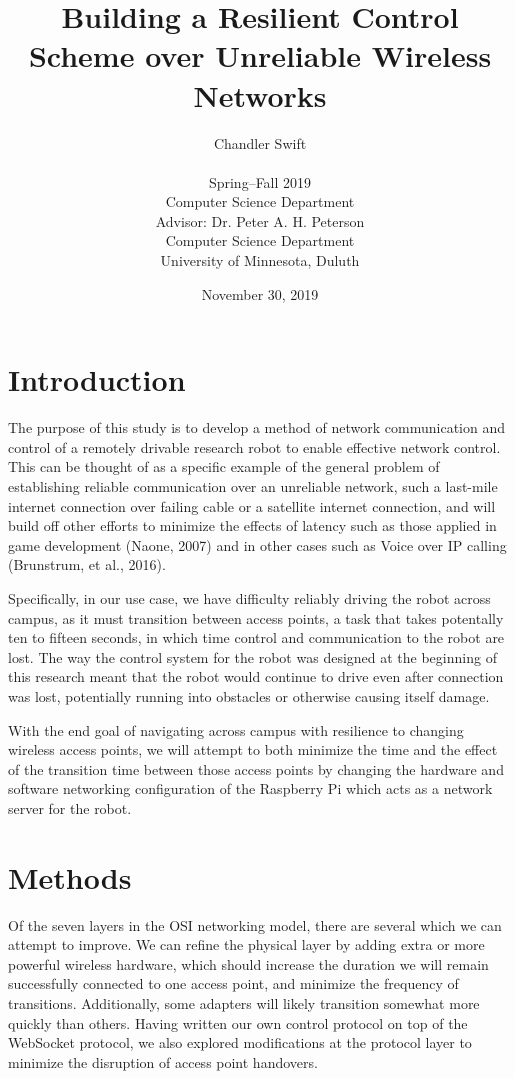 \documentclass[letterpaper, 11pt]{article}
\title{Building a Resilient Control Scheme over Unreliable Wireless Networks}
\author{Chandler Swift \\ \\
  Spring--Fall 2019 \\
  Computer Science Department \\
  Advisor: Dr. Peter A. H. Peterson \\
  Computer Science Department \\
  University of Minnesota, Duluth
}
\date{November 30, 2019}
\begin{document}
\maketitle
\section{Introduction}
The purpose of this study is to develop a method of network communication and
control of a remotely drivable research robot to enable effective network
control. This can be thought of as a specific example of the general problem
of establishing reliable communication over an unreliable network, such a
last-mile internet connection over failing cable or a satellite internet
connection, and will build off other efforts to minimize the effects of
latency such as those applied in game development (Naone, 2007) and in other
cases such as Voice over IP calling (Brunstrum,  et al., 2016).

Specifically, in our use case, we have difficulty reliably driving the robot
across campus, as it must transition between access points, a task that takes
potentally ten to fifteen seconds, in which time control and communication to
the robot are lost. The way the control system for the robot was designed at
the beginning of this research meant that the robot would continue to drive
even after connection was lost, potentially running into obstacles or
otherwise causing itself damage.

With the end goal of navigating across campus with resilience to changing
wireless access points, we will attempt to both minimize the time and the
effect of the transition time between those access points by changing the
hardware and software networking configuration of the Raspberry Pi which
acts as a network server for the robot.

\section{Methods}
Of the seven layers in the OSI networking model, there are several which we
can attempt to improve. We can refine the physical layer by adding extra or
more powerful wireless hardware, which should increase the duration we will
remain successfully connected to one access point, and minimize the frequency
of transitions. Additionally, some adapters will likely transition somewhat
more quickly than others. Having written our own control protocol on top of
the WebSocket protocol\cite{protocol}, we also explored modifications at the
protocol layer to minimize the disruption of access point handovers.
\end{document}
